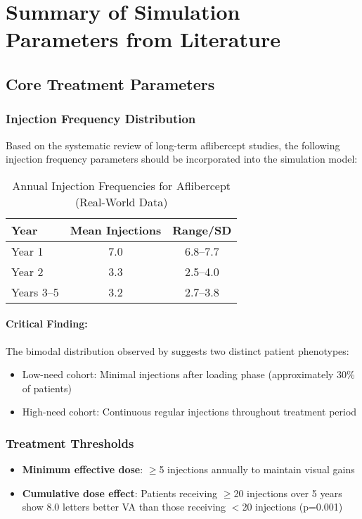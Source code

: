 
\section{Summary of Simulation Parameters from Literature}

\subsection{Core Treatment Parameters}

\subsubsection{Injection Frequency Distribution}
Based on the systematic review of long-term aflibercept studies, the following injection frequency parameters should be incorporated into the simulation model:

\begin{table}[h]
\centering
\caption{Annual Injection Frequencies for Aflibercept (Real-World Data)}
\begin{tabular}{lcc}
\hline
Year & Mean Injections & Range/SD \\
\hline
Year 1 & 7.0 & 6.8--7.7 \\
Year 2 & 3.3 & 2.5--4.0 \\
Years 3--5 & 3.2 & 2.7--3.8 \\
\hline
\end{tabular}
\end{table}

\paragraph{Critical Finding:} The bimodal distribution observed by \citet{nishikawaFourYearOutcomeAflibercept2019} suggests two distinct patient phenotypes:
\begin{itemize}
    \item Low-need cohort: Minimal injections after loading phase (approximately 30\% of patients)
    \item High-need cohort: Continuous regular injections throughout treatment period
\end{itemize}

\subsubsection{Treatment Thresholds}
\begin{itemize}
    \item \textbf{Minimum effective dose}: $\geq$5 injections annually to maintain visual gains \citep{kimImpactInjectionFrequency2020}
    \item \textbf{Cumulative dose effect}: Patients receiving $\geq$20 injections over 5 years show 8.0 letters better VA than those receiving $<$20 injections (p=0.001)
\end{itemize}


